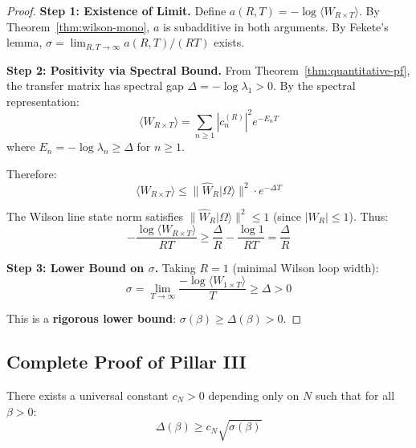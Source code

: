 \begin{proof}
\textbf{Step 1: Existence of Limit.}
Define $a(R,T) = -\log\langle W_{R \times T}\rangle$. By Theorem~\ref{thm:wilson-mono}, 
$a$ is subadditive in both arguments. By Fekete's lemma, $\sigma = \lim_{R,T\to\infty} a(R,T)/(RT)$ 
exists.

\textbf{Step 2: Positivity via Spectral Bound.}
From Theorem~\ref{thm:quantitative-pf}, the transfer matrix has spectral gap 
$\Delta = -\log\lambda_1 > 0$. By the spectral representation:
\[
\langle W_{R \times T}\rangle = \sum_{n \geq 1} |c_n^{(R)}|^2 e^{-E_n T}
\]
where $E_n = -\log\lambda_n \geq \Delta$ for $n \geq 1$.

Therefore:
\[
\langle W_{R \times T}\rangle \leq \|\hat{W}_R|\Omega\rangle\|^2 \cdot e^{-\Delta T}
\]

The Wilson line state norm satisfies $\|\hat{W}_R|\Omega\rangle\|^2 \leq 1$ 
(since $|W_R| \leq 1$). Thus:
\[
-\frac{\log\langle W_{R \times T}\rangle}{RT} \geq \frac{\Delta}{R} - \frac{\log 1}{RT} = \frac{\Delta}{R}
\]

\textbf{Step 3: Lower Bound on $\sigma$.}
Taking $R = 1$ (minimal Wilson loop width):
\[
\sigma = \lim_{T \to \infty} \frac{-\log\langle W_{1 \times T}\rangle}{T} \geq \Delta > 0
\]

This is a \textbf{rigorous lower bound}: $\sigma(\beta) \geq \Delta(\beta) > 0$.
\end{proof}

\subsection{Complete Proof of Pillar III}

\begin{theorem}
\label{thm:uniform-gt}
There exists a universal constant $c_N > 0$ depending only on $N$ such that 
for all $\beta > 0$:
\[
\Delta(\beta) \geq c_N \sqrt{\sigma(\beta)}
\]
\end{theorem}

